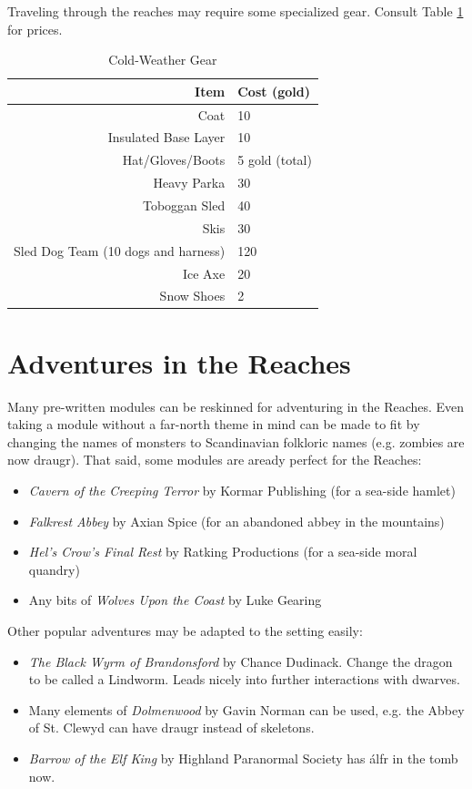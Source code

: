 \documentclass[notitlepage]{article}
\begin{document}
\begin{multicols}{2}
Traveling through the reaches may require some specialized gear.
Consult Table \ref{tab:gear} for prices.

\begin{table}[t]
  \centering
  \begin{tabular}{|r|l|} \hline
    Item & Cost (gold)  \\ \hline
    Coat & 10  \\
    Insulated Base Layer & 10 \\ 
    Hat/Gloves/Boots & 5 gold (total) \\
    Heavy Parka & 30 \\
    Toboggan Sled & 40 \\
    Skis & 30 \\
    Sled Dog Team (10 dogs and harness) & 120 \\
    Ice Axe & 20 \\
    Snow Shoes & 2 \\
 \hline \end{tabular}
  \caption{Cold-Weather Gear}
  \label{tab:gear}
\end{table}

  \section{Adventures in the Reaches}

  Many pre-written modules can be reskinned for adventuring in the Reaches.
  Even taking a module without a far-north theme in mind can be made to fit by changing the names of monsters to Scandinavian folkloric names (e.g. zombies are now draugr).
  That said, some modules are aready perfect for the Reaches:

  \begin{itemize}
  \item \emph{Cavern of the Creeping Terror} by Kormar Publishing (for a sea-side hamlet)
  \item \emph{Falkrest Abbey} by Axian Spice (for an abandoned abbey in the mountains)
  \item \emph{Hel's Crow's Final Rest} by Ratking Productions (for a sea-side moral quandry)
  \item Any bits of \emph{Wolves Upon the Coast} by Luke Gearing
  \end{itemize}

  Other popular adventures may be adapted to the setting easily:

  \begin{itemize}
  \item \emph{The Black Wyrm of Brandonsford} by Chance Dudinack. Change the dragon to be called a Lindworm. Leads nicely into further interactions with dwarves.
  \item Many elements of \emph{Dolmenwood} by Gavin Norman can be used, e.g. the Abbey of St. Clewyd can have draugr instead of skeletons.
  \item \emph{Barrow of the Elf King} by Highland Paranormal Society has \'alfr in the tomb now.
  \end{itemize}


\end{multicols}
\end{document}
